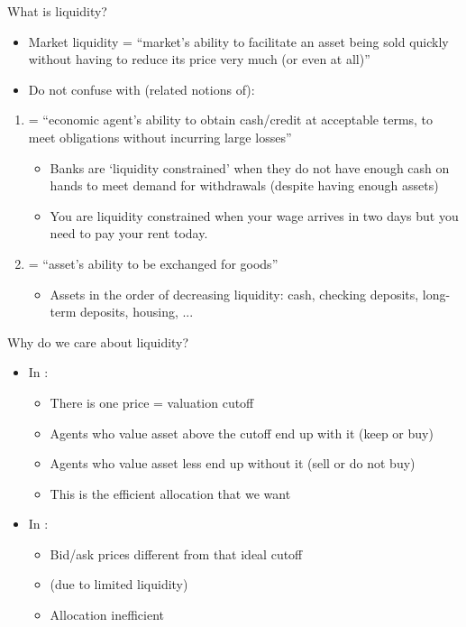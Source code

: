 \documentclass[english,10pt]{beamer}
\begin{document}
\begin{frame}{What is liquidity?}
\begin{itemize}
	\item \alert{Market liquidity} = ``market's ability to facilitate an asset being sold quickly without having to reduce its price very much (or even at all)''
	\item Do not confuse with (related notions of):
\end{itemize}
\begin{enumerate}
	\item {} = ``economic agent's ability to obtain cash/credit at acceptable terms, to meet obligations without incurring large losses''
	\begin{itemize}
		\item Banks are `liquidity constrained' when they do not have enough cash on hands to meet demand for withdrawals (despite having enough assets)
		\item You are liquidity constrained when your wage arrives in two days but you need to pay your rent today.
	\end{itemize}
	\item {} = ``asset's ability to be exchanged for goods''
	\begin{itemize}
		\item Assets in the order of decreasing liquidity: cash, checking deposits, long-term deposits, housing, ...
	\end{itemize}
\end{enumerate}
\end{frame}


\begin{frame}{Why do we care about liquidity?}
	\begin{itemize}
		\item In :
		\begin{itemize}
			\item There is one price = valuation cutoff
			\item Agents who value asset above the cutoff end up with it (keep or buy)
			\item Agents who value asset less end up without it (sell or do not buy)
			\item This is the \alert{efficient} allocation that we want
		\end{itemize}
	\pause
		\item In :
		\begin{itemize}
			\item Bid/ask prices different from that ideal cutoff
			\item (due to limited liquidity)
			\item Allocation \alert{inefficient}
		\end{itemize}
	\end{itemize}
\end{frame}
\end{document}
